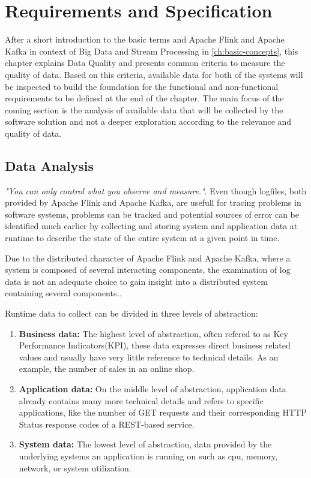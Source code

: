 \chapter{Requirements and Specification}
\label{ch:requirements}
After a short introduction to the basic terms and Apache Flink and Apache Kafka in
context of Big Data and Stream Processing in \autoref{ch:basic-concepts}, this chapter explains Data Quality and
presents common criteria to measure the quality of data. Based on this criteria, available data
for both of the systems will be inspected to build the foundation for the functional
and non-functional requirements to be defined at the end of the chapter. The main focus
of the coming section is the analysis of available data that will be collected by the software
solution and not a deeper exploration according to the relevance and quality of data.

\section{Data Analysis}
\label{sec:data-analysis}
\textit{"You can only control what you observe and measure."}\cite{Ebert07}. Even though logfiles, both
provided by Apache Flink and Apache Kafka, are usefull for tracing problems in software
systems, problems can be tracked and potential sources of error can be identified much
earlier by collecting and storing system and application data at runtime to describe the
state of the entire system at a given point in time.

Due to the distributed character of Apache Flink and Apache Kafka, where a system is
composed of several interacting components, the examination of log data is not an
adequate choice to gain insight into a distributed system containing several components.\cite{VanL14}.

Runtime data to collect can be divided in three levels of abstraction:

\begin{enumerate}
    \item \textbf{Business data:} The highest level of abstraction, often refered to as Key Performance
    Indicators(KPI), these data expresses direct business related values and
    usually have very little reference to technical details. As an example, the number of
    sales in an online shop.
    \item \textbf{Application data:} On the middle level of abstraction, application data already
    contains many more technical details and refers to specific applications, like the
    number of GET requests and their corresponding HTTP Status response codes of a
    REST-based service.
    \item \textbf{System data:} The lowest level of abstraction, data provided by the underlying
    systems an application is running on such as cpu, memory, network, or system utilization.
\end{enumerate}

